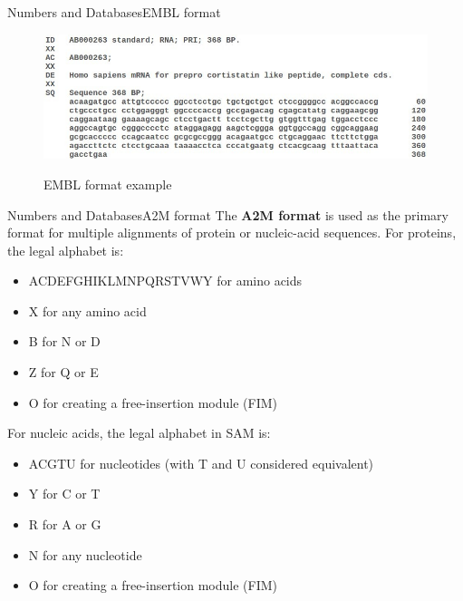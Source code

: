 \documentclass[10pt]{beamer}
\begin{document}
{%
\begin{frame}{Numbers and Databases}{EMBL format}
\begin{figure}[]
 \centering
    \includegraphics[width=\textwidth,height=0.7\textheight,keepaspectratio]{img/numbers/embl.jpg}
    \label{img:mot2}
    \caption{EMBL format example}
\end{figure}
\end{frame}

\begin{frame}{Numbers and Databases}{A2M format}
The \textbf{A2M format} is used as the primary format for multiple alignments of protein or nucleic-acid sequences. For proteins, the legal alphabet is:
\begin{itemize}
    \item  ACDEFGHIKLMNPQRSTVWY for amino acids
    \item  X for any amino acid
    \item  B for N or D
    \item  Z for Q or E
    \item  O for creating a free-insertion module (FIM) 
\end{itemize}

For nucleic acids, the legal alphabet in SAM is:
\begin{itemize}
    \item  ACGTU for nucleotides (with T and U considered equivalent)
    \item  Y for C or T
    \item  R for A or G
    \item  N for any nucleotide
    \item  O for creating a free-insertion module (FIM) 
\end{itemize}
\end{frame}

}
\end{document}
